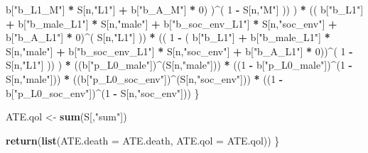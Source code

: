 \documentclass[
]{book}
\newenvironment{Shaded}{\begin{snugshade}}{\end{snugshade}}
\newcommand{\AttributeTok}[1]{\textcolor[rgb]{0.13,0.29,0.53}{#1}}
\newcommand{\DecValTok}[1]{\textcolor[rgb]{0.00,0.00,0.81}{#1}}
\newcommand{\FunctionTok}[1]{\textcolor[rgb]{0.13,0.29,0.53}{\textbf{#1}}}
\newcommand{\NormalTok}[1]{#1}
\newcommand{\OtherTok}[1]{\textcolor[rgb]{0.56,0.35,0.01}{#1}}
\newcommand{\SpecialCharTok}[1]{\textcolor[rgb]{0.81,0.36,0.00}{\textbf{#1}}}
\newcommand{\StringTok}[1]{\textcolor[rgb]{0.31,0.60,0.02}{#1}}
\begin{document}
\begin{Shaded}
\begin{Highlighting}[]
\NormalTok{                                    b[}\StringTok{"b\_L1\_M"}\NormalTok{] }\SpecialCharTok{*}\NormalTok{ S[n,}\StringTok{"L1"}\NormalTok{] }\SpecialCharTok{+}
\NormalTok{                                    b[}\StringTok{"b\_A\_M"}\NormalTok{] }\SpecialCharTok{*} \DecValTok{0}\NormalTok{) )}\SpecialCharTok{\^{}}\NormalTok{( }\DecValTok{1} \SpecialCharTok{{-}}\NormalTok{ S[n,}\StringTok{"M"}\NormalTok{] )) ) }\SpecialCharTok{*}
\NormalTok{                        (( b[}\StringTok{"b\_L1"}\NormalTok{] }\SpecialCharTok{+}
\NormalTok{                             b[}\StringTok{"b\_male\_L1"}\NormalTok{] }\SpecialCharTok{*}\NormalTok{ S[n,}\StringTok{"male"}\NormalTok{] }\SpecialCharTok{+}  
\NormalTok{                             b[}\StringTok{"b\_soc\_env\_L1"}\NormalTok{] }\SpecialCharTok{*}\NormalTok{ S[n,}\StringTok{"soc\_env"}\NormalTok{] }\SpecialCharTok{+}
\NormalTok{                             b[}\StringTok{"b\_A\_L1"}\NormalTok{] }\SpecialCharTok{*} \DecValTok{0}\NormalTok{)}\SpecialCharTok{\^{}}\NormalTok{( S[n,}\StringTok{"L1"}\NormalTok{] )) }\SpecialCharTok{*}
\NormalTok{                        (( }\DecValTok{1} \SpecialCharTok{{-}}\NormalTok{ ( b[}\StringTok{"b\_L1"}\NormalTok{] }\SpecialCharTok{+}
\NormalTok{                                   b[}\StringTok{"b\_male\_L1"}\NormalTok{] }\SpecialCharTok{*}\NormalTok{ S[n,}\StringTok{"male"}\NormalTok{] }\SpecialCharTok{+}  
\NormalTok{                                   b[}\StringTok{"b\_soc\_env\_L1"}\NormalTok{] }\SpecialCharTok{*}\NormalTok{ S[n,}\StringTok{"soc\_env"}\NormalTok{] }\SpecialCharTok{+}
\NormalTok{                                   b[}\StringTok{"b\_A\_L1"}\NormalTok{] }\SpecialCharTok{*} \DecValTok{0}\NormalTok{))}\SpecialCharTok{\^{}}\NormalTok{( }\DecValTok{1} \SpecialCharTok{{-}}\NormalTok{ S[n,}\StringTok{"L1"}\NormalTok{] )) ) }\SpecialCharTok{*}
\NormalTok{      ((b[}\StringTok{"p\_L0\_male"}\NormalTok{])}\SpecialCharTok{\^{}}\NormalTok{(S[n,}\StringTok{"male"}\NormalTok{])) }\SpecialCharTok{*} 
\NormalTok{      ((}\DecValTok{1} \SpecialCharTok{{-}}\NormalTok{ b[}\StringTok{"p\_L0\_male"}\NormalTok{])}\SpecialCharTok{\^{}}\NormalTok{(}\DecValTok{1} \SpecialCharTok{{-}}\NormalTok{ S[n,}\StringTok{"male"}\NormalTok{])) }\SpecialCharTok{*} 
\NormalTok{      ((b[}\StringTok{"p\_L0\_soc\_env"}\NormalTok{])}\SpecialCharTok{\^{}}\NormalTok{(S[n,}\StringTok{"soc\_env"}\NormalTok{])) }\SpecialCharTok{*}
\NormalTok{      ((}\DecValTok{1} \SpecialCharTok{{-}}\NormalTok{ b[}\StringTok{"p\_L0\_soc\_env"}\NormalTok{])}\SpecialCharTok{\^{}}\NormalTok{(}\DecValTok{1} \SpecialCharTok{{-}}\NormalTok{ S[n,}\StringTok{"soc\_env"}\NormalTok{])) }
\NormalTok{    \}}
  
\NormalTok{  ATE.qol }\OtherTok{\textless{}{-}} \FunctionTok{sum}\NormalTok{(S[,}\StringTok{"sum"}\NormalTok{])}
  
  \FunctionTok{return}\NormalTok{(}\FunctionTok{list}\NormalTok{(}\AttributeTok{ATE.death =}\NormalTok{ ATE.death, }\AttributeTok{ATE.qol =}\NormalTok{ ATE.qol))}
\NormalTok{\}}
\end{Highlighting}
\end{Shaded}
\end{document}
